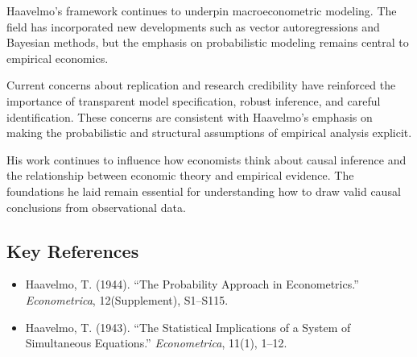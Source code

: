 Haavelmo's framework continues to underpin macroeconometric modeling. The
field has incorporated new developments such as vector autoregressions and
Bayesian methods, but the emphasis on probabilistic modeling remains central
to empirical economics.

Current concerns about replication and research credibility have reinforced
the importance of transparent model specification, robust inference, and
careful identification. These concerns are consistent with Haavelmo's
emphasis on making the probabilistic and structural assumptions of empirical
analysis explicit.

His work continues to influence how economists think about causal inference
and the relationship between economic theory and empirical evidence. The
foundations he laid remain essential for understanding how to draw valid
causal conclusions from observational data.

\subsection*{Key References}
\begin{itemize}
    \item Haavelmo, T. (1944). ``The Probability Approach in Econometrics.'' \textit{Econometrica}, 12(Supplement), S1--S115.
    \item Haavelmo, T. (1943). ``The Statistical Implications of a System of Simultaneous Equations.'' \textit{Econometrica}, 11(1), 1--12.
\end{itemize}
